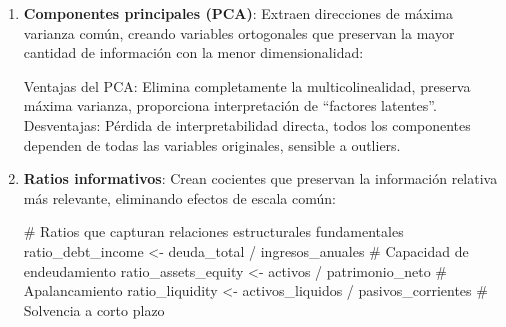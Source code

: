 \documentclass[
  letterpaper,
  DIV=11,
  numbers=noendperiod]{scrreprt}
\newenvironment{Shaded}{\begin{snugshade}}{\end{snugshade}}
\newcommand{\AttributeTok}[1]{\textcolor[rgb]{0.40,0.45,0.13}{#1}}
\newcommand{\CommentTok}[1]{\textcolor[rgb]{0.37,0.37,0.37}{#1}}
\newcommand{\ConstantTok}[1]{\textcolor[rgb]{0.56,0.35,0.01}{#1}}
\newcommand{\DecValTok}[1]{\textcolor[rgb]{0.68,0.00,0.00}{#1}}
\newcommand{\FunctionTok}[1]{\textcolor[rgb]{0.28,0.35,0.67}{#1}}
\newcommand{\NormalTok}[1]{\textcolor[rgb]{0.00,0.23,0.31}{#1}}
\newcommand{\OtherTok}[1]{\textcolor[rgb]{0.00,0.23,0.31}{#1}}
\newcommand{\SpecialCharTok}[1]{\textcolor[rgb]{0.37,0.37,0.37}{#1}}
\begin{document}
\begin{enumerate}
\def\labelenumi{\arabic{enumi}.}
\item
  \textbf{Componentes principales (PCA)}: Extraen direcciones de máxima
  varianza común, creando variables ortogonales que preservan la mayor
  cantidad de información con la menor dimensionalidad:

\begin{Shaded}
\end{Shaded}

  Ventajas del PCA: Elimina completamente la multicolinealidad, preserva
  máxima varianza, proporciona interpretación de ``factores latentes''.
  Desventajas: Pérdida de interpretabilidad directa, todos los
  componentes dependen de todas las variables originales, sensible a
  outliers.
\item
  \textbf{Ratios informativos}: Crean cocientes que preservan la
  información relativa más relevante, eliminando efectos de escala
  común:

\begin{Shaded}
\begin{Highlighting}[]
\CommentTok{\# Ratios que capturan relaciones estructurales fundamentales}
\NormalTok{ratio\_debt\_income }\OtherTok{\textless{}{-}}\NormalTok{ deuda\_total }\SpecialCharTok{/}\NormalTok{ ingresos\_anuales  }\CommentTok{\# Capacidad de endeudamiento}
\NormalTok{ratio\_assets\_equity }\OtherTok{\textless{}{-}}\NormalTok{ activos }\SpecialCharTok{/}\NormalTok{ patrimonio\_neto     }\CommentTok{\# Apalancamiento}
\NormalTok{ratio\_liquidity }\OtherTok{\textless{}{-}}\NormalTok{ activos\_liquidos }\SpecialCharTok{/}\NormalTok{ pasivos\_corrientes  }\CommentTok{\# Solvencia a corto plazo}
\end{Highlighting}
\end{Shaded}


\end{enumerate}
\end{document}
